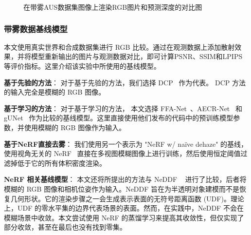 \begin{figure}[p]
    \centering
    \caption{在带雾AUS数据集图像上渲染RGB图片和预测深度的对比图}
    \label{fig:dehazenerf-synt-rgbd}
\end{figure}








\subsubsection{带雾数据基线模型}



本文使用真实世界和合成数据集进行 RGB 比较。通过在观测数据上添加散射效果，并将模型重新输出的图片与观测数据对比，即可计算PSNR、SSIM和LPIPS等评价指标。这里介绍该实验中所使用的基线模型。

\textbf{基于先验的方法}：
对于基于先验的方法，我们选择 DCP~\cite{kaiming_he_single_2009} 作为代表。 DCP 方法的输入完全是模糊的 RGB 图像。

\textbf{基于学习的方法}：
对于基于学习的方法， 本文选择 FFA-Net~\cite{qin_ffa-net_2020}、AECR-Net~\cite{wu_contrastive_2021} 和 gUNet ~\cite{song_rethinking_2022}作为比较的基线模型。这里直接使用他们发布的代码中的预训练模型参数，并使用模糊的 RGB 图像作为输入。

\textbf{基于NeRF直接去雾}：
我们使用另一个表示为 "NeRF w/ na\"ive dehaze" 的基线，使用视角无关的 NeRF~\cite{mildenhall_nerf_2020} 直接在多视图模糊图像上进行训练，然后使用恒定阈值过滤掉低于它的所有体积密度渲染。

\textbf{NeRF 相关基线模型}：
本文还将所提出的方法与 NeDDF ~\cite{ueda_neural_2022} 进行了比较，后者将模糊的 RGB 图像和相机位姿作为输入。NeDDF 旨在为半透明对象建模而不是恢复几何形状。它的渲染步骤之一会生成表示表面的无符号距离函数 (UDF)。理论上，UDF 的零水平集的边界代表场景的表面。然而，在实践中，NeDDF 不会在模糊场景中收敛。本文尝试使用 NeRF 的蒸馏学习来提高其收敛性，但仅实现了部分收敛，甚至在最后也没有找到零集。

